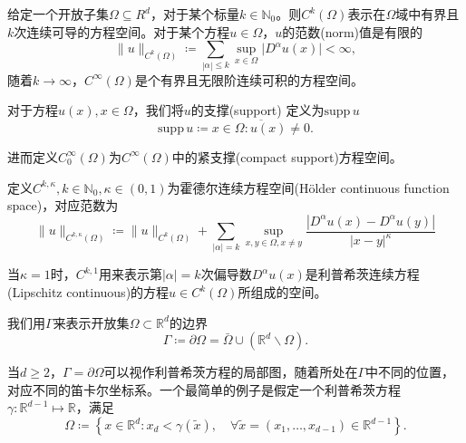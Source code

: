 给定一个开放子集$\Omega \subseteq R^{d}$，对于某个标量$k \in \mathbb{N}_0$。则$C^{k}(\Omega)$表示在$\Omega$域中有界且$k$次连续可导的方程空间。对于某个方程$u \in \Omega$，$u$的范数(norm)值是有限的
\begin{equation*}
  \| u \|_{C^{k}(\Omega)} \coloneqq \sum_{\left| \alpha \right| \le k} \sup_{x \in \Omega} \big| D^{\alpha} u(x) \big| < \infty,
\end{equation*}
随着$k \rightarrow \infty$，$C^{\infty}(\Omega)$是个有界且无限阶连续可积的方程空间。

对于方程$u(x), x \in \Omega$，我们将$u$的支撑(support) 定义为$\text{supp} \, u$
\begin{equation*}
  \text{supp} \, u \coloneqq \overline{x \in \Omega: u(x) \neq 0}.
\end{equation*}

进而定义$C_0^{\infty}(\Omega)$为$C^{\infty}(\Omega)$中的紧支撑(compact support)方程空间。

定义$C^{k,\kappa}, k \in \mathbb{N}_0, \kappa \in (0,1)$为霍德尔连续方程空间(Hölder continuous function space)，对应范数为
\begin{equation*}
  \| u \|_{C^{k,\kappa}(\Omega)} \coloneqq \| u \|_{C^{k}(\Omega)} + \sum_{\left| \alpha \right| = k} \sup_{x,y\in\Omega, x \neq y} \frac{\left| D^{\alpha}u(x)-D^{\alpha}u(y) \right|}{\left| x - y \right|^{\kappa}}
\end{equation*}

当$\kappa=1$时，$C^{k,1}$用来表示第$\left| \alpha \right|=k$次偏导数$D^{\alpha}u(x)$是利普希茨连续方程(Lipschitz continuous)的方程$u \in C^{k}(\Omega)$所组成的空间。

我们用$\Gamma$来表示开放集$\Omega \subset \mathbb{R}^d$的边界
\begin{equation*}
  \Gamma \coloneqq \partial \Omega = \bar{\Omega} \cup \left( \mathbb{R}^d \backslash \Omega \right).
\end{equation*}

当$d \ge 2$，$\Gamma = \partial \Omega$可以视作利普希茨方程的局部图，随着所处在$\Gamma$中不同的位置，对应不同的笛卡尔坐标系。一个最简单的例子是假定一个利普希茨方程$\gamma: \mathbb{R}^{d-1} \mapsto \mathbb{R}$，满足
\begin{equation*}
  \Omega \coloneqq \left\{
  x \in \mathbb{R}^d: x_d < \gamma(\tilde{x}), \quad \forall \tilde{x}=(x_1,\ldots,x_{d-1}) \in \mathbb{R}^{d-1}
  \right\}.
\end{equation*}

